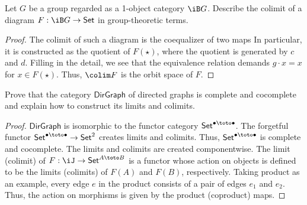 \documentclass{amsart}
\begin{document}
\begin{ex}
  Let $G$ be a group regarded as a 1-object category $\iB G$.
  Describe the colimit of a diagram $F : \iB G \to \mathsf{Set}$ in group-theoretic terms.
\end{ex}
\begin{proof}
  The colimit of such a diagram is the coequalizer of two maps 
  In particular, it is constructed as the quotient of $F(\star)$, where the quotient is generated by $c$ and $d$.
  Filling in the detail, we see that the equivalence relation demands $g \cdot x = x$ for $x \in F(\star)$.
  Thus, $\colim F$ is the orbit space of $F$.
\end{proof}

\begin{ex}
  Prove that the category $\mathsf{DirGraph}$ of directed graphs is complete and cocomplete and explain how to construct its limits and colimits.
\end{ex}
\begin{proof}
  $\mathsf{DirGraph}$ is isomorphic to the functor category $\mathsf{Set}^{\bullet \toto \bullet}$.
  The forgetful functor $\mathsf{Set}^{\bullet \toto \bullet} \to \mathsf{Set}^{2}$ creates limits and colimits.
  Thus, $\mathsf{Set}^{\bullet \toto \bullet}$ is complete and cocomplete.
  The limits and colimits are created componentwise.
  The limit (colimit) of $F : \iJ \to \mathsf{Set}^{A \toto B}$ is a functor whose action on objects is defined to be the limits (colimits) of $F(A)$ and $F(B)$, respectively.
  Taking product as an example, every edge $e$ in the product consists of a pair of edges $e_{1}$ and $e_{2}$.
  Thus, the action on morphisms is given by the product (coproduct) maps.
\end{proof}



\end{document}
